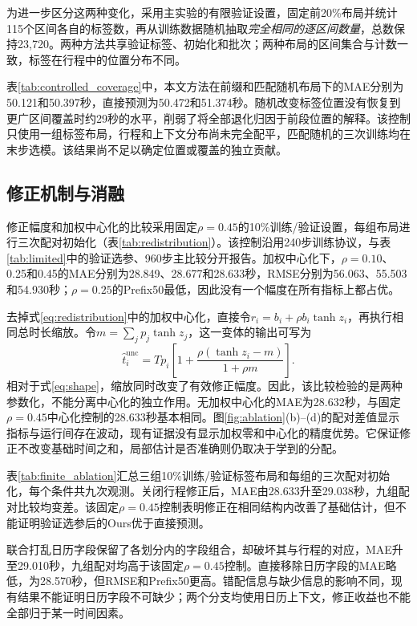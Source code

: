 
为进一步区分这两种变化，采用主实验的有限验证设置，固定前20\%布局并统计115个区间各自的标签数，再从训练数据随机抽取\emph{完全相同的逐区间数量}，总数保持23,720。两种方法共享验证标签、初始化和批次；两种布局的区间集合与计数一致，标签在行程中的位置分布不同。

表\ref{tab:controlled_coverage}中，本文方法在前缀和匹配随机布局下的MAE分别为50.121和50.397秒，直接预测为50.472和51.374秒。随机改变标签位置没有恢复到更广区间覆盖时约29秒的水平，削弱了将全部退化归因于前段位置的解释。该控制只使用一组标签布局，行程和上下文分布尚未完全配平，匹配随机的三次训练均在末步选模。该结果尚不足以确定位置或覆盖的独立贡献。

\subsection{修正机制与消融}

修正幅度和加权中心化的比较采用固定$\rho=0.45$的10\%训练/验证设置，每组布局进行三次配对初始化（表\ref{tab:redistribution}）。该控制沿用240步训练协议，与表\ref{tab:limited}中的验证选参、960步主比较分开报告。加权中心化下，$\rho=0.10$、0.25和0.45的MAE分别为28.849、28.677和28.633秒，RMSE分别为56.063、55.503和54.930秒；$\rho=0.25$的Prefix50最低，因此没有一个幅度在所有指标上都占优。

去掉式\eqref{eq:redistribution}中的加权中心化，直接令$r_i=b_i+\rho b_i\tanh z_i$，再执行相同总时长缩放。令$m=\sum_jp_j\tanh z_j$，这一变体的输出可写为
\begin{equation}
\hat t_i^{\mathrm{unc}}=T p_i\left[1+\frac{\rho(\tanh z_i-m)}{1+\rho m}\right].
\end{equation}
相对于式\eqref{eq:shape}，缩放同时改变了有效修正幅度。因此，该比较检验的是两种参数化，不能分离中心化的独立作用。无加权中心化的MAE为28.632秒，与固定$\rho=0.45$中心化控制的28.633秒基本相同。图\ref{fig:ablation}(b)--(d)的配对差值显示指标与运行间存在波动，现有证据没有显示加权零和中心化的精度优势。它保证修正不改变基础时间之和，局部估计是否准确则仍取决于学到的分配。


表\ref{tab:finite_ablation}汇总三组10\%训练/验证标签布局和每组的三次配对初始化，每个条件共九次观测。关闭行程修正后，MAE由28.633升至29.038秒，九组配对比较均变差。该固定$\rho=0.45$控制表明修正在相同结构内改善了基础估计，但不能证明验证选参后的Ours优于直接预测。

联合打乱日历字段保留了各划分内的字段组合，却破坏其与行程的对应，MAE升至29.010秒，九组配对均高于该固定$\rho=0.45$控制。直接移除日历字段的MAE略低，为28.570秒，但RMSE和Prefix50更高。错配信息与缺少信息的影响不同，现有结果不能证明日历字段不可缺少；两个分支均使用日历上下文，修正收益也不能全部归于某一时间因素。

